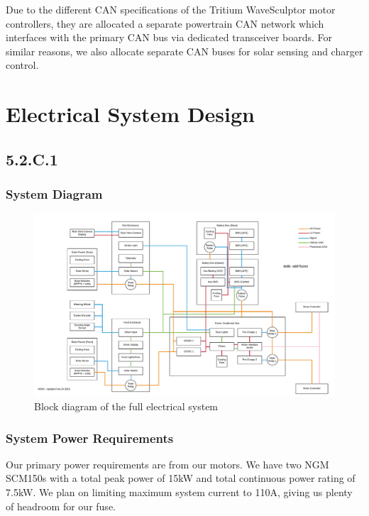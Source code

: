 \documentclass[10pt]{article}
\begin{document}
Due to the different CAN specifications of the Tritium WaveSculptor motor controllers, they are allocated a separate powertrain CAN network which interfaces with the primary CAN bus via dedicated transceiver boards. For similar reasons, we also allocate separate CAN buses for solar sensing and charger control.

\section{Electrical System Design}

\subsection{5.2.C.1}

\subsubsection{System Diagram}

\begin{figure}[H]
    \centering
    \includegraphics[width=\textwidth,page=4]{figures/msxii-block-diagrams}
    \caption{Block diagram of the full electrical system}
    \label{fig:msxii-electrical-full-block-diagram}
\end{figure}

\subsubsection{System Power Requirements}

Our primary power requirements are from our motors. We have two NGM SCM150s with a total peak power of 15kW and total continuous power rating of 7.5kW. We plan on limiting maximum system current to 110A, giving us plenty of headroom for our fuse.
\end{document}
